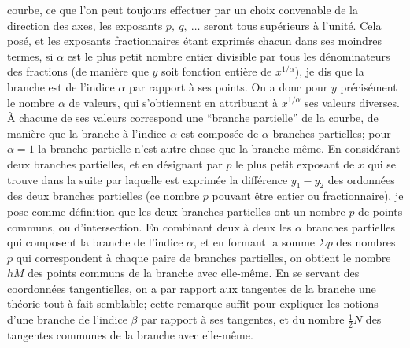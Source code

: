 \documentclass[11pt]{article}
\begin{document}
courbe, ce que l'on peut toujours effectuer par un choix convenable de la direction des axes, les exposants $p,\ q,\ \ldots$ seront tous sup\'erieurs \`a l'unit\'e. Cela pos\'e, et les exposants fractionnaires \'etant exprim\'es chacun dans ses moindres termes, si $\alpha$ est le plus petit nombre entier divisible par tous les d\'enominateurs des fractions (de mani\`ere que $y$ soit fonction enti\`ere de $x^{1/\alpha}$), je dis que la branche est de l'indice $\alpha$ par rapport \`a ses points. On a donc pour $y$ pr\'ecis\'ement le nombre $\alpha$ de valeurs, qui s'obtiennent en attribuant \`a $x^{1/\alpha}$ ses valeurs diverses. \`A chacune de ses valeurs correspond une ``branche partielle'' de la courbe, de mani\`ere que la branche \`a l'indice $\alpha$ est compos\'ee de $\alpha$ branches partielles; pour $\alpha = 1$ la branche partielle n'est autre chose que la branche m\^eme. En consid\'erant deux branches partielles, et en d\'esignant par $p$ le plus petit exposant de $x$ qui se trouve dans la suite par laquelle est exprim\'ee la diff\'erence $y_{1} - y_{2}$ des ordonn\'ees des deux branches partielles (ce nombre $p$ pouvant \^etre entier ou fractionnaire), je pose comme d\'efinition que les deux branches partielles ont un nombre $p$ de points communs, ou d'intersection. En combinant deux \`a deux les $\alpha$ branches partielles qui composent la branche de l'indice $\alpha$, et en formant la somme $\Sigma p$ des nombres $p$ qui correspondent \`a chaque paire de branches partielles, on obtient le nombre $hM$ des points communs de la branche avec elle-m\^eme. En se servant des coordonn\'ees tangentielles, on a par rapport aux tangentes de la branche une th\'eorie tout \`a fait semblable; cette remarque suffit pour expliquer les notions d'une branche de l'indice $\beta$ par rapport \`a ses tangentes, et du nombre $\tfrac{1}{2}N$ des tangentes communes de la branche avec elle-m\^eme.
\end{document}
